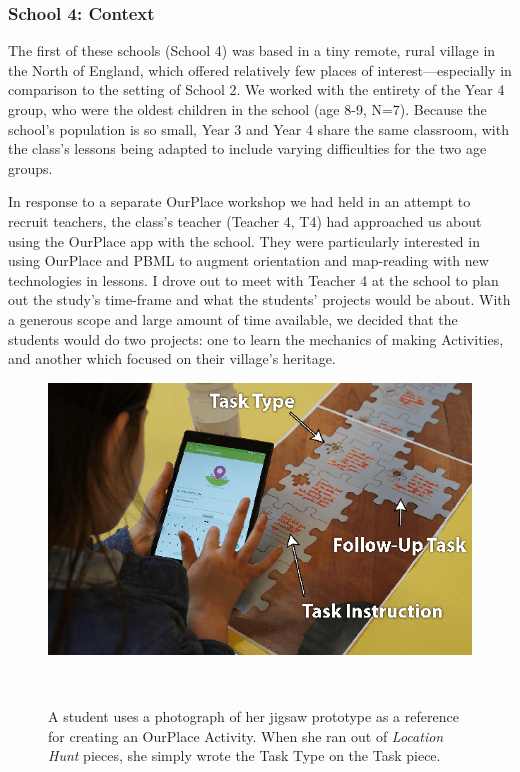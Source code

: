 \subsubsection{School 4: Context}

The first of these schools (School 4) was based in a tiny remote, rural village in the North of England, which offered relatively few places of interest---especially in comparison to the setting of School 2. We worked with the entirety of the Year 4 group, who were the oldest children in the school (age 8-9, N=7). Because the school's population is so small, Year 3 and Year 4 share the same classroom, with the class's lessons being adapted to include varying difficulties for the two age groups. 

In response to a separate OurPlace workshop we had held in an attempt to recruit teachers, the class's teacher (Teacher 4, T4) had approached us about using the OurPlace app with the school. They were particularly interested in using OurPlace and PBML to augment orientation and map-reading with new technologies in lessons. I drove out to meet with Teacher 4 at the school to plan out the study's time-frame and what the students' projects would be about. With a generous scope and large amount of time available, we decided that the students would do two projects: one to learn the mechanics of making Activities, and another which focused on their village's heritage. 

\begin{figure}
\centering
  \includegraphics[width=0.7\columnwidth]{images/chapter08/jigsawToApp}
  \caption[A student referring to her paper prototype]{A student uses a photograph of her jigsaw prototype as a reference for creating an OurPlace Activity. When she ran out of \textit{Location Hunt} pieces, she simply wrote the Task Type on the Task piece.}~\label{fig:JigsawToApp}
\end{figure}

